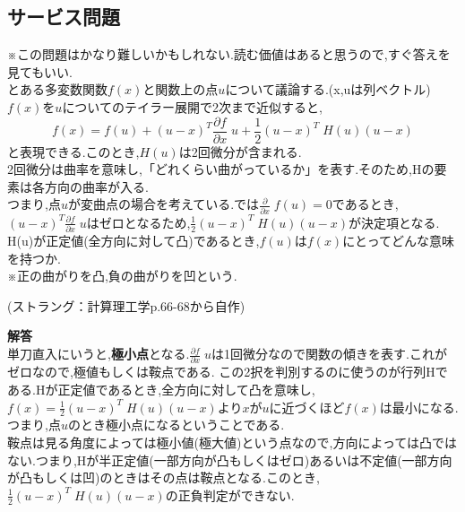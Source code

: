 \subsection{サービス問題}
※この問題はかなり難しいかもしれない.読む価値はあると思うので,すぐ答えを見てもいい.
\vspace{5mm}\\
\hspace{1em}
とある多変数関数$f(x)$と関数上の点$u$について議論する.(x,uは列ベクトル)\\
$f(x)$を$u$についてのテイラー展開で2次まで近似すると,
\[
f(x)=f(u)+(u-x)^T \frac{\partial f}{\partial x}\;u+\frac{1}{2}(u-x)^T\;H(u)(u-x)\]
と表現できる.このとき,$H(u)$は2回微分が含まれる.\\
2回微分は曲率を意味し,「どれくらい曲がっているか」を表す.そのため,Hの要素は各方向の曲率が入る.\\
つまり,点$u$が変曲点の場合を考えている.では$\displaystyle\frac{\partial}{\partial x}\;f(u)=0$であるとき,$\displaystyle(u-x)^T \frac{\partial f}{\partial x}\;u$はゼロとなるため,$\displaystyle\frac{1}{2}(u-x)^T\;H(u)(u-x)$が決定項となる.\\
H(u)が正定値(全方向に対して凸)であるとき,$f(u)$は$f(x)$にとってどんな意味を持つか.\\
※正の曲がりを凸,負の曲がりを凹という.
\begin{flushright}
    (ストラング：計算理工学p.66-68から自作)
\end{flushright}
\vspace{6.52mm}
\textbf{解答}\\
\hspace{1em}
単刀直入にいうと,\textbf{極小点}となる.$\frac{\partial f}{\partial x}\;u$は1回微分なので関数の傾きを表す.これがゼロなので,極値もしくは鞍点である.
この2択を判別するのに使うのが行列Hである.Hが正定値であるとき,全方向に対して凸を意味し,$f(x)=\frac{1}{2}(u-x)^T\;H(u)(u-x)$より$x$が$u$に近づくほど$f(x)$は最小になる.つまり,点$u$のとき極小点になるということである.\\
鞍点は見る角度によっては極小値(極大値)という点なので,方向によっては凸ではない.つまり,Hが半正定値(一部方向が凸もしくはゼロ)あるいは不定値(一部方向が凸もしくは凹)のときはその点は鞍点となる.このとき,$\frac{1}{2}(u-x)^T\;H(u)(u-x)$の正負判定ができない.

